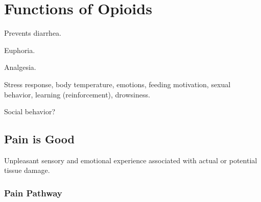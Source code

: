 \section{Functions of Opioids}

\begin{coloredlist}
    \item Prevents diarrhea.
    \item Euphoria.
    \item Analgesia.
    \item Stress response, body temperature, emotions, feeding  motivation, sexual behavior, learning (reinforcement), drowsiness.
    \item Social behavior?
\end{coloredlist}

\subsection{Pain is Good}

\begin{coloredlist}
    \item Unpleasant sensory and emotional experience associated with actual or potential tissue damage.
\end{coloredlist}

\subsubsection{Pain Pathway}

